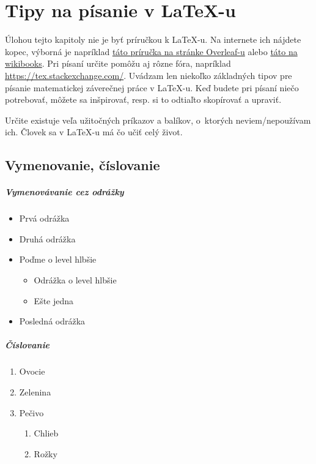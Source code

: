 \chapter{Tipy na písanie v \LaTeX-u} \label{sec:tipy}

Úlohou tejto kapitoly nie je byť príručkou k LaTeX-u. Na internete ich nájdete kopec, výborná je napríklad \href{https://www.overleaf.com/learn}{táto príručka na stránke Overleaf-u} alebo \href{https://en.wikibooks.org/wiki/LaTeX}{táto na wikibooks}. Pri písaní určite pomôžu aj rôzne fóra, napríklad \href{https://tex.stackexchange.com/}{https://tex.stackexchange.com/}. Uvádzam len niekoľko základných tipov pre písanie matematickej záverečnej práce v LaTeX-u. Keď budete pri písaní niečo potrebovať, môžete sa inšpirovať, resp. si to odtiaľto skopírovať a upraviť.

Určite existuje veľa užitočných príkazov a balíkov, o~ktorých neviem/nepoužívam ich. Človek sa v LaTeX-u má čo učiť celý život.

\section{Vymenovanie, číslovanie}

\paragraph{Vymenovávanie cez odrážky}
\begin{itemize}
	\item Prvá odrážka
	\item Druhá odrážka
	\item Poďme o level hlbšie
	\begin{itemize}
		\item Odrážka o level hlbšie
		\item Ešte jedna 
	\end{itemize}
	\item Posledná odrážka
\end{itemize}

\paragraph{Číslovanie}
\begin{enumerate}
	\item Ovocie
	\item Zelenina
	\item Pečivo
	\begin{enumerate}
		\item Chlieb
		\item Rožky
	\end{enumerate}
\end{enumerate}


